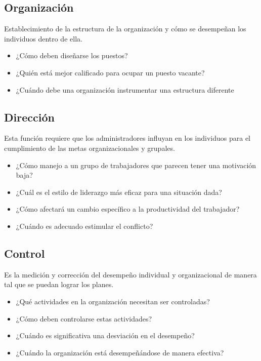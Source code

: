 \subsection{Organización} 

Establecimiento de la estructura de la organización y cómo se desempeñan los individuos dentro de ella. 

\begin{itemize}
\item ¿Cómo deben diseñarse los puestos? 

\item ¿Quién está mejor calificado para ocupar un puesto vacante? 

\item ¿Cuándo debe una organización instrumentar una estructura diferente

\end{itemize}

\subsection{Dirección} 

Esta función requiere que los administradores influyan en los individuos para el cumplimiento de las metas organizacionales y grupales. 

\begin{itemize}
\item ¿Cómo manejo a un grupo de trabajadores que parecen tener una motivación baja? 

\item ¿Cuál es el estilo de liderazgo más eficaz para una situación dada? 

\item ¿Cómo afectará un cambio específico a la productividad del trabajador? 

\item ¿Cuándo es adecuado estimular el conflicto? 

\end{itemize}
\subsection{Control} 

Es la medición y corrección del desempeño individual y organizacional de manera tal que se puedan lograr los planes.

\begin{itemize}
\item ¿Qué actividades en la organización necesitan ser controladas? 

\item ¿Cómo deben controlarse estas actividades? 

\item ¿Cuándo es significativa una desviación en el desempeño? 

\item ¿Cuándo la organización está desempeñándose de manera efectiva? 

\end{itemize}

